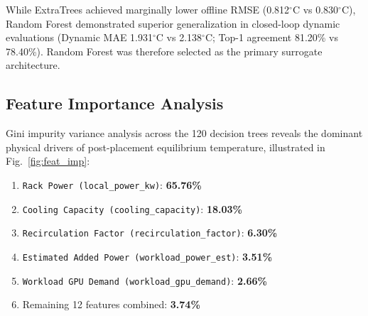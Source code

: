 \documentclass[conference,10pt]{IEEEtran}
\begin{document}
\begin{table}[htbp]
\caption{Offline Holdout and Closed-Loop Dynamic Model Comparison}
\label{tab:model_comparison}
\centering
{}
\end{table}

While ExtraTrees achieved marginally lower offline RMSE (0.812$^\circ$C vs 0.830$^\circ$C), Random Forest demonstrated superior generalization in closed-loop dynamic evaluations (Dynamic MAE 1.931$^\circ$C vs 2.138$^\circ$C; Top-1 agreement 81.20\% vs 78.40\%). Random Forest was therefore selected as the primary surrogate architecture.

\subsection{Feature Importance Analysis}
Gini impurity variance analysis across the 120 decision trees reveals the dominant physical drivers of post-placement equilibrium temperature, illustrated in Fig.~\ref{fig:feat_imp}:
\begin{enumerate}
    \item \texttt{Rack Power (local\_power\_kw)}: \textbf{65.76\%}
    \item \texttt{Cooling Capacity (cooling\_capacity)}: \textbf{18.03\%}
    \item \texttt{Recirculation Factor (recirculation\_factor)}: \textbf{6.30\%}
    \item \texttt{Estimated Added Power (workload\_power\_est)}: \textbf{3.51\%}
    \item \texttt{Workload GPU Demand (workload\_gpu\_demand)}: \textbf{2.66\%}
    \item Remaining 12 features combined: \textbf{3.74\%}
\end{enumerate}
\end{document}
